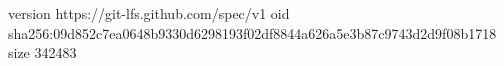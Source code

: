 version https://git-lfs.github.com/spec/v1
oid sha256:09d852c7ea0648b9330d6298193f02df8844a626a5e3b87c9743d2d9f08b1718
size 342483
